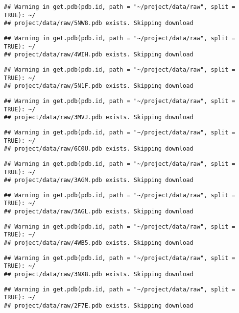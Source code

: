 \documentclass[
]{article}
\begin{document}
\begin{verbatim}
## Warning in get.pdb(pdb.id, path = "~/project/data/raw", split = TRUE): ~/
## project/data/raw/5NW8.pdb exists. Skipping download
\end{verbatim}

\begin{verbatim}
## Warning in get.pdb(pdb.id, path = "~/project/data/raw", split = TRUE): ~/
## project/data/raw/4WIH.pdb exists. Skipping download
\end{verbatim}

\begin{verbatim}
## Warning in get.pdb(pdb.id, path = "~/project/data/raw", split = TRUE): ~/
## project/data/raw/5N1F.pdb exists. Skipping download
\end{verbatim}

\begin{verbatim}
## Warning in get.pdb(pdb.id, path = "~/project/data/raw", split = TRUE): ~/
## project/data/raw/3MVJ.pdb exists. Skipping download
\end{verbatim}

\begin{verbatim}
## Warning in get.pdb(pdb.id, path = "~/project/data/raw", split = TRUE): ~/
## project/data/raw/6C0U.pdb exists. Skipping download
\end{verbatim}

\begin{verbatim}
## Warning in get.pdb(pdb.id, path = "~/project/data/raw", split = TRUE): ~/
## project/data/raw/3AGM.pdb exists. Skipping download
\end{verbatim}

\begin{verbatim}
## Warning in get.pdb(pdb.id, path = "~/project/data/raw", split = TRUE): ~/
## project/data/raw/3AGL.pdb exists. Skipping download
\end{verbatim}

\begin{verbatim}
## Warning in get.pdb(pdb.id, path = "~/project/data/raw", split = TRUE): ~/
## project/data/raw/4WB5.pdb exists. Skipping download
\end{verbatim}

\begin{verbatim}
## Warning in get.pdb(pdb.id, path = "~/project/data/raw", split = TRUE): ~/
## project/data/raw/3NX8.pdb exists. Skipping download
\end{verbatim}

\begin{verbatim}
## Warning in get.pdb(pdb.id, path = "~/project/data/raw", split = TRUE): ~/
## project/data/raw/2F7E.pdb exists. Skipping download
\end{verbatim}
\end{document}

